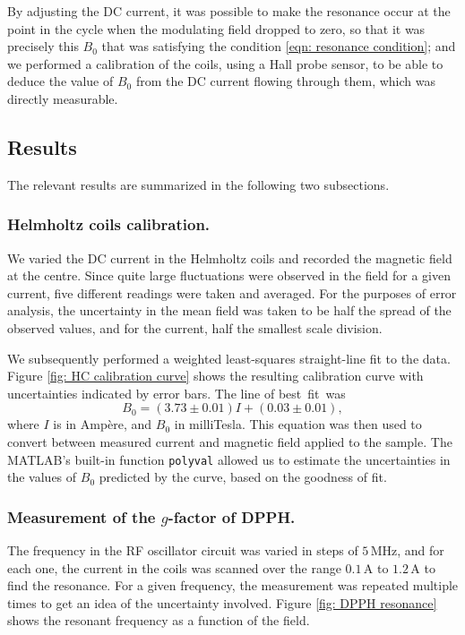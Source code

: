 \documentclass[a4paper]{jpconf}
\numberwithin{equation}{section}
\begin{document}
By adjusting the DC current, it was possible to make the resonance occur at the point in the cycle when the modulating field dropped to zero, so that it was precisely this $B_0$ that was satisfying the condition \eqref{eqn: resonance condition}; and we performed a calibration of the coils, using a Hall probe sensor, to be able to deduce the value of $B_0$ from the DC current flowing through them, which was directly measurable. 

\subsection{Results}
The relevant results are summarized in the following two subsections.

\subsubsection{Helmholtz coils calibration.} \label{section: calibration}
We varied the DC current in the Helmholtz coils and recorded the magnetic field at the centre. Since quite large fluctuations were observed in the field for a given current, five different readings were taken and averaged. For the purposes of error analysis, the uncertainty in the mean field was taken to be half the spread of the observed values, and for the current, half the smallest scale division. 

We subsequently performed a weighted least-squares straight-line fit to the data. Figure \ref{fig: HC calibration curve} shows the resulting calibration curve with uncertainties indicated by error bars. The line of best~fit~was 
\[
B_0 = (3.73 \pm 0.01) I + (0.03 \pm 0.01),
\]
where $I$ is in Amp\`ere, and $B_0$ in milliTesla. This equation was then used to convert between measured current and magnetic field applied to the sample. The MATLAB's built-in function \texttt{polyval} allowed us to estimate the uncertainties in the values of $B_0$ predicted by the curve, based on the goodness of fit.


\subsubsection{Measurement of the $g$-factor of DPPH.}
The frequency in the RF oscillator circuit was varied in steps of $5 \, \si{\mega\hertz}$, and for each one, the current in the coils was scanned over the range $0.1 \, \si{\ampere}$ to $1.2 \, \si{\ampere}$ to find the resonance. For a given frequency, the measurement was repeated multiple times to get an idea of the uncertainty involved. Figure \ref{fig: DPPH resonance} shows the resonant frequency as a function of the field.
\end{document}
